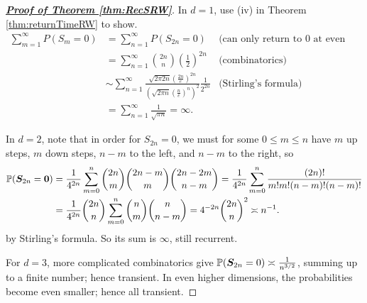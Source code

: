 \documentclass[10pt,a4paper]{article}
\begin{document}
\begin{proof}[\underline{\textbf{Proof of Theorem \ref{thm:RecSRW}}}]
	In $d=1$, use (iv) in Theorem \ref{thm:returnTimeRW} to show. 
	\begin{align*}
		\sum_{m=1}^{\infty}P(S_{m}=0)& =\sum_{n=1}^{\infty}P(S_{2n}=0) & \text{(can only return to 0 at even steps)} \\
		&=\sum\limits_{n=1}^\infty\binom{2n}{n}(\frac{1}{2})^{2n}& \text{(combinatorics)} \\
		&\sim\sum_{n=1}^\infty\frac{\sqrt{2\pi2n}(\frac{2n}e)^{2n}}{(\sqrt{2\pi n}(\frac ne)^n)^2}\frac1{2^{2n}}& \text{(Stirling's formula)} \\
		&=\sum_{n=1}^\infty\frac1{\sqrt{\pi n}}=\infty.
	\end{align*}

	In $d=2$, note that in order for $S_{2n}=0$, we must for some $0\leq m\leq n$ have $m$ up steps, $m$ down steps, $n-m$ to the left, and $n-m$ to the right, so 
	\begin{align*}
		\mathbb P({\boldsymbol S}_{2n}={\boldsymbol 0})&=\frac{1}{4^{2n}}\sum_{m=0}^{n}\binom{2n}{m}\binom{2n-m}{m}\binom{2n-2m}{n-m}=\frac{1}{4^{2n}}\sum_{m=0}^{n}\frac{(2n)!}{m! m! (n-m)! (n-m)!}\\
		&=\frac{1}{4^{2n}}\binom{2n}n\sum_{m=0}^n\binom nm\binom n{n-m}=4^{-2n}\binom{2n}n^2 \asymp  n^{-1}.
	\end{align*}  
	by Stirling's formula. So its sum is $\infty $, still recurrent.
	
	For $d=3$, more complicated combinatorics give $\mathbb P({\boldsymbol S}_{2n}=0)\asymp\frac{1}{n^{3/2}}$, summing up to a finite
	number; hence transient. In even higher dimensions, the probabilities become even smaller;
	hence all transient.
\end{proof}
\end{document}
